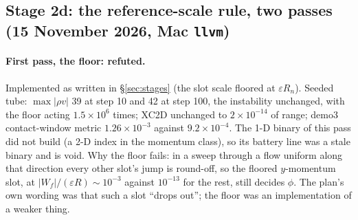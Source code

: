 \documentclass[11pt,a4paper]{article}
\newcommand{\code}[1]{\texttt{\small #1}}
\begin{document}
\subsection{Stage 2d: the reference-scale rule, two passes (15 November 2026, Mac \code{llvm})}
\label{sec:stage2d}

\paragraph{First pass, the floor: refuted.}  Implemented as written in
\S\ref{sec:stages} (the slot scale floored at $\varepsilon R_n$).  Seeded
tube: $\max|\rho v|$ 39 at step 10 and 42 at step 100, the instability
unchanged, with the floor acting $1.5\times10^{6}$ times; XC2D unchanged
to $2\times10^{-14}$ of range; demo3 contact-window metric
$1.26\times10^{-3}$ against $9.2\times10^{-4}$.  The 1-D binary of this
pass did not build (a 2-D index in the momentum class), so its battery
line was a stale binary and is void.  Why the floor fails: in a sweep
through a flow uniform along that direction every other slot's jump is
round-off, so the floored $y$-momentum slot, at $|W_f|/(\varepsilon R)
\sim 10^{-3}$ against $10^{-13}$ for the rest, still decides $\phi$.  The
plan's own wording was that such a slot ``drops out''; the floor was an
implementation of a weaker thing.
\end{document}
